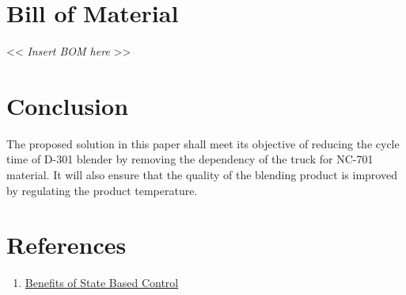 \documentclass[a4paper,oneside]{article}
\begin{document}
\section{Bill of Material}
\label{sec:orgf7dc073}
<< \emph{Insert BOM here} >>
\clearpage
\section{Conclusion}
\label{sec:org5066801}
The proposed solution in this paper shall meet its objective of
reducing the cycle time of D-301 blender by removing the dependency of
the truck for NC-701 material. It will also ensure that the quality of
the blending product is improved by regulating the product
temperature.
\section{References}
\label{sec:org3591b14}
\begin{enumerate}
\item \href{https://www.controlglobal.com/assets/knowledge\_centers/abb/assets/Benefits-of-state-based-control-white-paper.pdf}{Benefits of State Based Control}
\end{enumerate}
\end{document}
